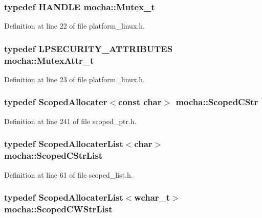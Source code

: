 \hypertarget{namespacemocha_a7d7ee3c4481d1e56611227f6d0f64c9e}{
\subsubsection[{Mutex\_\-t}]{\setlength{\rightskip}{0pt plus 5cm}typedef HANDLE {\bf mocha::Mutex\_\-t}}}
\label{namespacemocha_a7d7ee3c4481d1e56611227f6d0f64c9e}


Definition at line 22 of file platform\_\-linux.h.

\hypertarget{namespacemocha_aa6ad34d20d975440c46c6d1d2a7aa750}{
\subsubsection[{MutexAttr\_\-t}]{\setlength{\rightskip}{0pt plus 5cm}typedef LPSECURITY\_\-ATTRIBUTES {\bf mocha::MutexAttr\_\-t}}}
\label{namespacemocha_aa6ad34d20d975440c46c6d1d2a7aa750}


Definition at line 23 of file platform\_\-linux.h.

\hypertarget{namespacemocha_a3f8a89f92e0d05e36bd62f2bb382b31e}{
\subsubsection[{ScopedCStr}]{\setlength{\rightskip}{0pt plus 5cm}typedef {\bf ScopedAllocater}$<$const char$>$ {\bf mocha::ScopedCStr}}}
\label{namespacemocha_a3f8a89f92e0d05e36bd62f2bb382b31e}


Definition at line 241 of file scoped\_\-ptr.h.

\hypertarget{namespacemocha_a9fd5cb0f5cf48fb1391e6214b4ce1e57}{
\subsubsection[{ScopedCStrList}]{\setlength{\rightskip}{0pt plus 5cm}typedef {\bf ScopedAllocaterList}$<$char$>$ {\bf mocha::ScopedCStrList}}}
\label{namespacemocha_a9fd5cb0f5cf48fb1391e6214b4ce1e57}


Definition at line 61 of file scoped\_\-list.h.

\hypertarget{namespacemocha_aa47aa86b8def9202e92891d26d17c6fb}{
\subsubsection[{ScopedCWStrList}]{\setlength{\rightskip}{0pt plus 5cm}typedef {\bf ScopedAllocaterList}$<$wchar\_\-t$>$ {\bf mocha::ScopedCWStrList}}}
\label{namespacemocha_aa47aa86b8def9202e92891d26d17c6fb}


